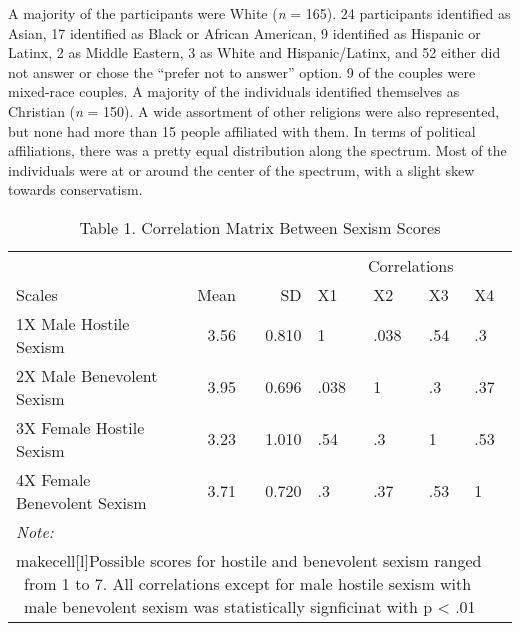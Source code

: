 \documentclass[
  english,
  man,floatsintext]{apa6}
\begin{document}
A majority of the participants were White (\emph{n} = 165). 24 participants identified as Asian, 17 identified as Black or African American, 9 identified as Hispanic or Latinx, 2 as Middle Eastern, 3 as White and Hispanic/Latinx, and 52 either did not answer or chose the \enquote{prefer not to answer} option. 9 of the couples were mixed-race couples. A majority of the individuals identified themselves as Christian (\emph{n} = 150). A wide assortment of other religions were also represented, but none had more than 15 people affiliated with them. In terms of political affiliations, there was a pretty equal distribution along the spectrum. Most of the individuals were at or around the center of the spectrum, with a slight skew towards conservatism.

\begin{table}

\caption{\label{tab:unnamed-chunk-2}Table 1. Correlation Matrix Between Sexism Scores}
\begin{tabular}[t]{l|r|r|l|l|l|l}
\hline
\multicolumn{3}{c|}{ } & \multicolumn{4}{c}{Correlations} \\
\cline{4-7}
Scales & Mean & SD & X1 & X2 & X3 & X4\\
\hline
1X Male Hostile Sexism & 3.56 & 0.810 & 1 & .038 & .54 & .3\\
\hline
2X Male Benevolent Sexism & 3.95 & 0.696 & .038 & 1 & .3 & .37\\
\hline
3X Female Hostile Sexism & 3.23 & 1.010 & .54 & .3 & 1 & .53\\
\hline
4X Female Benevolent Sexism & 3.71 & 0.720 & .3 & .37 & .53 & 1\\
\hline
\multicolumn{7}{l}{\rule{0pt}{1em}\textit{Note: }}\\
\multicolumn{7}{l}{\rule{0pt}{1em}makecell[l]{Possible scores for hostile and benevolent sexism ranged \           from 1 to 7. All correlations except for male hostile sexism with \           male benevolent sexism was statistically signficinat with p < .01}}\\
\end{tabular}
\end{table}
\end{document}
